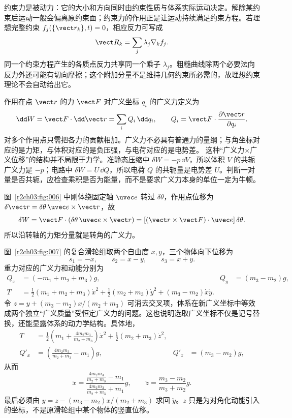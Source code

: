约束力是被动力：它的大小和方向同时由约束性质与体系实际运动决定。解除某约束后运动一般会偏离原约束面；约束力的作用正是让运动持续满足约束方程。若理想完整约束 $f_j(\{\vect r_k\},t)=0$，相应反力可写成
\begin{equation}
 \vect R_k=\sum_j\lambda_j\nabla_k f_j .
 \label{r2ch03:eq:006}
\end{equation}
同一个约束方程产生的各质点反力共享同一个乘子 $\lambda_j$。粗糙曲线除两个必要法向反力外还可能有切向摩擦；这个附加分量不是维持几何约束所必需的，故理想约束理论不会自动给出它。

作用在点 $\vect r$ 的力 $\vect F$ 对广义坐标 $q_i$ 的广义力定义为
\begin{equation}
 \dd W=\vect F\cdot\dd\vect r=\sum_iQ_i\,\dd q_i,\qquad
 Q_i=\vect F\cdot\frac{\partial\vect r}{\partial q_i}.
 \label{r2ch03:eq:007}
\end{equation}
对多个作用点只需把各力的贡献相加。广义力不必具有普通力的量纲；与角坐标对应的是力矩，与体积对应的是负压强，与电荷对应的是电势差。
这种“广义力×广义位移”的结构并不局限于力学。准静态压缩中 $\delta W=-p\,\dd V$，所以体积 $V$ 的共轭广义力是 $-p$；电路中 $\delta W=U\,\dd Q$，所以电荷 $Q$ 的共轭量是电势差 $U$。判断一对量是否共轭，应检查乘积是否为能量，而不是要求广义力本身的单位一定为牛顿。

图~\ref{r2ch03:fig:006} 中刚体绕固定轴 $\uvec e$ 转过 $\delta\theta$，作用点位移为
$\delta\vect r=\delta\theta\,\uvec e\times\vect r$，故
\[
 \delta W=\vect F\cdot(\delta\theta\,\uvec e\times\vect r)
 =[(\vect r\times\vect F)\cdot\uvec e]\,\delta\theta .
\]
所以沿转轴的力矩分量就是转角的广义力。
\figTorqueGeneralized

图~\ref{r2ch03:fig:007} 的复合滑轮组取两个自由度 $x,y$，三个物体向下位移为
\[
 s_1=-x,\qquad s_2=x-y,\qquad s_3=x+y .
\]
重力对应的广义力和动能分别为
\begin{align}
 Q_x&=(-m_1+m_2+m_3)g,& Q_y&=(m_3-m_2)g, \label{r2ch03:eq:008}\\
 T&=\frac12(m_1+m_2+m_3)\dot x^2
 +\frac12(m_2+m_3)\dot y^2+(m_3-m_2)\dot x\dot y . \label{r2ch03:eq:009}
\end{align}
令 $z=y+(m_3-m_2)x/(m_2+m_3)$ 可消去交叉项，体系在新广义坐标中等效成两个独立“广义质量”受恒定广义力的问题。这也说明选取广义坐标不仅是记号替换，还能显露体系的动力学结构。具体地，
\begin{align*}
 T&=\frac12\left(m_1+\frac{4m_2m_3}{m_2+m_3}\right)\dot x^2
   +\frac12(m_2+m_3)\dot z^2,\\
 Q'_x&=\left(\frac{4m_2m_3}{m_2+m_3}-m_1\right)g,
 &Q'_z&=(m_3-m_2)g,
\end{align*}
从而
\[
 \ddot x=
 \frac{\frac{4m_2m_3}{m_2+m_3}-m_1}
      {\frac{4m_2m_3}{m_2+m_3}+m_1} g,
 \qquad
 \ddot z=\frac{m_3-m_2}{m_3+m_2} g.
\]
最后必须由 $y=z-(m_3-m_2)x/(m_2+m_3)$ 求回 $\ddot y$。$z$ 只是为对角化动能引入的坐标，不是原滑轮组中某个物体的竖直位移。
\figPulleyGeneralized

